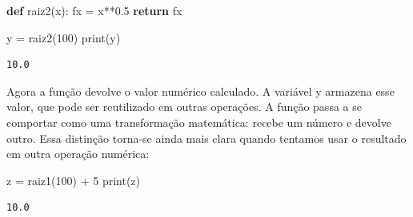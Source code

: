 \documentclass[
  brazilian,
  letterpaper,
  DIV=11,
  numbers=noendperiod]{scrreprt}
\newenvironment{Shaded}{\begin{snugshade}}{\end{snugshade}}
\newcommand{\BuiltInTok}[1]{\textcolor[rgb]{0.00,0.23,0.31}{#1}}
\newcommand{\ControlFlowTok}[1]{\textcolor[rgb]{0.00,0.23,0.31}{\textbf{#1}}}
\newcommand{\DecValTok}[1]{\textcolor[rgb]{0.68,0.00,0.00}{#1}}
\newcommand{\FloatTok}[1]{\textcolor[rgb]{0.68,0.00,0.00}{#1}}
\newcommand{\KeywordTok}[1]{\textcolor[rgb]{0.00,0.23,0.31}{\textbf{#1}}}
\newcommand{\NormalTok}[1]{\textcolor[rgb]{0.00,0.23,0.31}{#1}}
\newcommand{\OperatorTok}[1]{\textcolor[rgb]{0.37,0.37,0.37}{#1}}
\begin{document}
\begin{Shaded}
\begin{Highlighting}[]
\KeywordTok{def}\NormalTok{ raiz2(x):}
\NormalTok{    fx }\OperatorTok{=}\NormalTok{ x}\OperatorTok{**}\FloatTok{0.5}
    \ControlFlowTok{return}\NormalTok{ fx}

\NormalTok{y }\OperatorTok{=}\NormalTok{ raiz2(}\DecValTok{100}\NormalTok{)}
\BuiltInTok{print}\NormalTok{(y)}
\end{Highlighting}
\end{Shaded}

\begin{verbatim}
10.0
\end{verbatim}

Agora a função devolve o valor numérico calculado. A variável y armazena
esse valor, que pode ser reutilizado em outras operações. A função passa
a se comportar como uma transformação matemática: recebe um número e
devolve outro. Essa distinção torna-se ainda mais clara quando tentamos
usar o resultado em outra operação numérica:

\begin{Shaded}
\begin{Highlighting}[]
\NormalTok{z }\OperatorTok{=}\NormalTok{ raiz1(}\DecValTok{100}\NormalTok{) }\OperatorTok{+} \DecValTok{5}
\BuiltInTok{print}\NormalTok{(z)}
\end{Highlighting}
\end{Shaded}

\begin{verbatim}
10.0
\end{verbatim}
\end{document}
